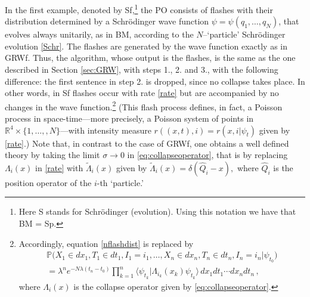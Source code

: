 \documentclass[12pt]{article}
\newcommand{\PPP}{\mathbb{P}}
\newcommand{\RRR}{\mathbb{R}}
\begin{document}
In the first example, denoted by {\sf Sf},\footnote{Here {\sf S} stands for Schr\"odinger (evolution). Using this notation we have that {\sf BM} = {\sf Sp}.} the PO consists of flashes with their distribution determined by a Schr\"odinger wave function $\psi =\psi (q_1, \ldots, q_N)$, that evolves always unitarily, as in {\sf BM}, according to the $N$--`particle' Schr\"odinger evolution \eqref{Schr}.
The flashes are generated by the wave function exactly as in {\sf GRWf}. Thus, the algorithm, whose output is the flashes, is the same as the one described in Section \ref{sec:GRW}, with steps 1., 2. and 3., with the following difference: the first sentence in step 2. is dropped, since no collapse takes place. 
In other words, in {\sf Sf} flashes occur with rate \eqref{rate} but are accompanied by no changes in the wave function.\footnote{Accordingly, equation \eqref{nflashdist} is replaced by
\begin{multline}
  \PPP\bigl( X_1\in d x_1, T_1 \in d t_1, I_1 = i_1, \ldots,
 X_n \in dx_n, T_n \in d t_n, I_n = i_n   |  \psi_{t_0} \bigr)  \\ 
=\lambda^n e^{-N\lambda (t_n-t_0)}   \prod_{k=1}^{n}
\langle \psi_{t_{k}} |  \Lambda_{i_k}(x_{k})\psi_{t_{k}}
\rangle \, dx_{1}dt_1   \cdots  dx_{n}dt_n \,, \nonumber
\end{multline}
where $\Lambda_{i}(x)$ is the collapse operator given by
\eqref{eq:collapseoperator}.}  (This flash process defines, in fact, a
Poisson process in space-time---more precisely, a Poisson system of points in
$\RRR^4\times\{1,\dots,,N\}$---with intensity measure
$r((x,t),i)=r(x,i|\psi_t)$ given by \eqref{rate}.) Note that, in contrast
to the case of {\sf GRWf}, one obtains a well defined theory by taking the
limit $\sigma\rightarrow 0$ in \eqref{eq:collapseoperator}, that is by
replacing $\Lambda_{i}(x)$ in \eqref{rate} with $\tilde{\Lambda}_i(x)$
given by $ \tilde{\Lambda}_i(x)=\delta(\widehat{Q}_i-x),
\label{eq:opsa}
$
where $\widehat{Q}_i$ is the position operator of the $i$-th `particle.'
\end{document}
